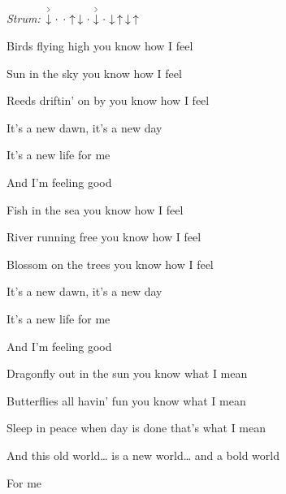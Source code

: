 \begin{song}


\begin{headerbox}
\RaiseBoxWithAccents
{} \quad
\textit{Strum:} $\AccentDown\Miss\Miss\Up\Down\Miss\AccentDown\Miss\Down\Up\Down\Up$
\end{headerbox}

\begin{hchordbox}
\end{hchordbox}

\Large

\bigskip

\Intro {}    \par

\bigskip

 Birds flying high  you know how I feel \par
{} Sun in the sky  you know how I feel \par
{}Reeds driftin' on by  you know how I feel \par
It's a new dawn, it's a new day \par
It's a new life  for me  \par
And I'm feeling good    \par

\bigskip

 Fish in the sea  you know how I feel \par
{} River running free  you know how I feel \par
{} Blossom on the trees  you know how I feel \par
It's a new dawn, it's a new day \par
It's a new life  for me  \par
And I'm feeling good    \par

\bigskip

 Dragonfly out in the sun  you know what I mean \par %
{} Butterflies all havin' fun  you know what I mean \par
{} Sleep in peace when day is done  that's what I mean \par
And this old world… is a new world… and a bold world  \par
For me    \par


\end{song}
